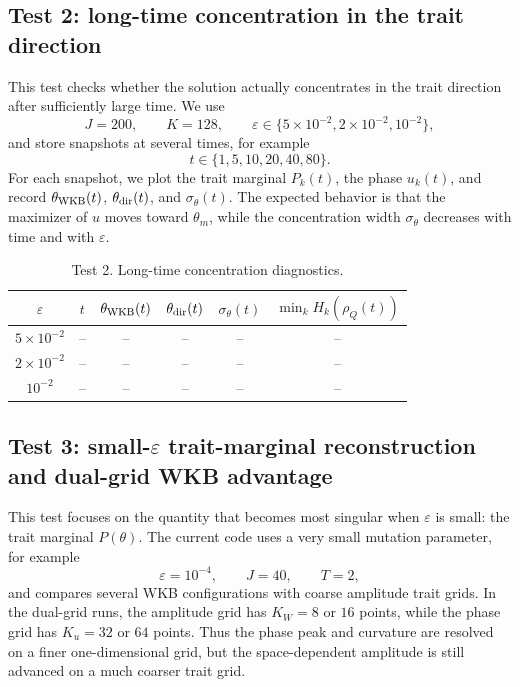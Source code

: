 \documentclass[11pt]{article}
\begin{document}
\subsection{Test 2: long-time concentration in the trait direction}\label{subsec:test_long_time_concentration_new}

This test checks whether the solution actually concentrates in the trait direction after sufficiently large time.  We use
\[
    J=200,
    \qquad K=128,
    \qquad \varepsilon\in\{5\times10^{-2},2\times10^{-2},10^{-2}\},
\]
and store snapshots at several times, for example
\[
    t\in\{1,5,10,20,40,80\}.
\]
For each snapshot, we plot the trait marginal \(P_k(t)\), the phase \(u_k(t)\), and record \(\theta_{\rm WKB}(t)\), \(\theta_{\rm dir}(t)\), and \(\sigma_\theta(t)\).  The expected behavior is that the maximizer of \(u\) moves toward \(\theta_m\), while the concentration width \(\sigma_\theta\) decreases with time and with \(\varepsilon\).

\begin{table}[ht]
\centering
\caption{Test 2. Long-time concentration diagnostics.}
\begin{tabular}{cccccc}
\toprule
$\varepsilon$ & $t$ & $\theta_{\rm WKB}(t)$ & $\theta_{\rm dir}(t)$ & $\sigma_\theta(t)$ & $\min_k H_k(\rho_Q(t))$\\
\midrule
$5\times10^{-2}$ & -- & -- & -- & -- & --\\
$2\times10^{-2}$ & -- & -- & -- & -- & --\\
$10^{-2}$ & -- & -- & -- & -- & --\\
\bottomrule
\end{tabular}
\end{table}


\subsection{Test 3: small-\(\varepsilon\) trait-marginal reconstruction and dual-grid WKB advantage}\label{subsec:test_fine_grid_n_new}

This test focuses on the quantity that becomes most singular when
\(\varepsilon\) is small: the trait marginal \(P(\theta)\).  The current code
uses a very small mutation parameter, for example
\[
    \varepsilon=10^{-4},
    \qquad J=40,
    \qquad T=2,
\]
and compares several WKB configurations with coarse amplitude trait grids.  In
the dual-grid runs, the amplitude grid has \(K_W=8\) or \(16\) points, while the
phase grid has \(K_u=32\) or \(64\) points.  Thus the phase peak and curvature
are resolved on a finer one-dimensional grid, but the space-dependent amplitude
is still advanced on a much coarser trait grid.
\end{document}

